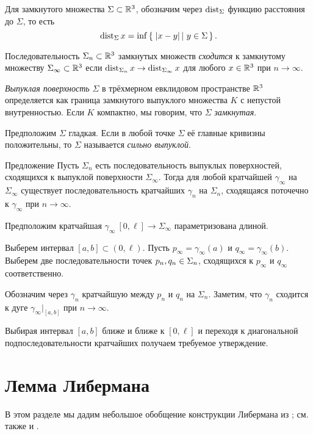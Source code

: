 \documentclass[a4paper,10pt]{article}
\begin{document}
Для замкнутого множества $\Sigma\subset \mathbb{R}^3$,
обозначим через $\operatorname{dist}_\Sigma$ функцию расстояния до $\Sigma$,
то есть
\[\dist_\Sigma x=\inf\set{|x-y|}{y\in\Sigma}.\]

Последовательность $\Sigma_n\subset \mathbb{R}^3$ замкнутых множеств 
\emph{сходится} к замкнутому множеству $\Sigma_\infty\subset \mathbb{R}^3$ 
если 
$\operatorname{dist}_{\Sigma_n}x\to\operatorname{dist}_{\Sigma_\infty}x$ для любого $x\in\mathbb{R}^3$ при $n\to\infty$.


\emph{Выпуклая поверхность} $\Sigma$ в трёхмерном евклидовом пространстве  $\mathbb{R}^3$ определяется как граница замкнутого выпуклого множества $K$ с непустой внутренностью.
Если $K$ компактно, мы говорим, что $\Sigma$ \emph{замкнутая}.

Предположим $\Sigma$ гладкая.
Если в любой точке $\Sigma$ 
её главные кривизны положительны, 
то $\Sigma$ называется \emph{сильно выпуклой}. 

\begin{thm}{Предложение}\label{prop:convegence}
Пусть $\Sigma_n$ есть последовательность выпуклых поверхностей, сходящихся к выпуклой поверхности $\Sigma_\infty$.
Тогда для любой кратчайшей $\gamma_\infty$ на $\Sigma_\infty$ 
существует последовательность кратчайших $\gamma_n$ на $\Sigma_n$, сходящаяся поточечно к $\gamma_\infty$ при $n\to \infty$.
\end{thm}

Предположим кратчайшая $\gamma_\infty\:[0,\ell]\to\Sigma_\infty$ параметризована длиной.

Выберем интервал $[a,b]\subset (0,\ell)$.
Пусть $p_\infty=\gamma_\infty(a)$ и $q_\infty=\gamma_\infty(b)$.
Выберем две последовательности точек $p_n,q_n\zz\in\Sigma_n$, сходящихся к $p_\infty$ и $q_\infty$ соответственно.

Обозначим через $\gamma_n$ кратчайшую между $p_n$ и $q_n$ на $\Sigma_n$.
Заметим, что $\gamma_n$ сходится к дуге $\gamma_\infty|_{[a,b]}$
при $n\to\infty$.

Выбирая интервал $[a,b]$ ближе и ближе к $[0,\ell]$ и переходя к диагональной подпоследовательности кратчайших получаем требуемое утверждение.
\qeds

\section{Лемма Либермана}

В этом разделе мы дадим небольшое обобщение конструкции Либермана из \cite{liberman};
см. также \cite{milka-liberman} и \cite{petrunin}.
\end{document}
